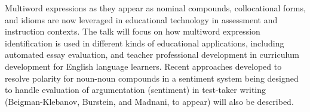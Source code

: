 Multiword expressions as they appear as nominal compounds, collocational forms, and idioms are now leveraged in educational technology in assessment and
 instruction contexts. The talk will focus on how multiword expression
 identification is used in different kinds of educational applications,
 including automated essay evaluation, and teacher professional development in
 curriculum development for English language learners. Recent approaches
 developed to resolve polarity for noun-noun compounds in a sentiment system
 being designed to handle evaluation of argumentation (sentiment) in test-taker
 writing (Beigman-Klebanov, Burstein, and Madnani, to appear) will also be
 described.

